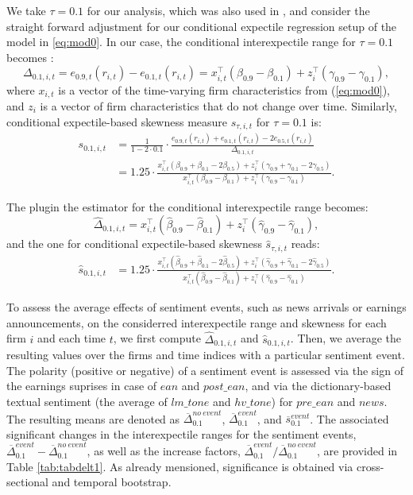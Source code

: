 \documentclass[11pt]{article}
\begin{document}
We take \(\tau=0.1\) for our analysis, which was also used in \cite{eberl2022sk}, and consider the straight forward adjustment for our conditional expectile regression setup of the model in \eqref{eq:mod0}. In our case, the conditional interexpectile range for $\tau=0.1$ becomes :
\[\Delta_{0.1,i,t} = e_{0.9,t}(r_{i,t}) -  e_{0.1,t}(r_{i,t}) = x_{i,t}^\top (\beta_{0.9} - \beta_{0.1}) + z_i^\top(\gamma_{0.9} - \gamma_{0.1}),\]
where $x_{i,t}$ is a vector of the time-varying firm characteristics from (\ref{eq:mod0}), and $z_i$ is a vector of firm characteristics that do not change over time. Similarly, conditional expectile-based skewness measure $\hat s_{\tau,i,t}$ for $\tau=0.1$ is:
\begin{align*}s_{0.1,i,t} &= \frac 1{1-2\cdot0.1}\cdot\frac{e_{0.9,t}(r_{i,t}) + e_{0.1,t}(r_{i,t}) - 2e_{0.5,t}(r_{i,t})}{\Delta_{0.1,i,t}}\\
&=1.25\cdot\frac{x_{i,t}^\top (\beta_{0.9} + \beta_{0.1} - 2\beta_{0.5}) + z_i^\top(\gamma_{0.9} + \gamma_{0.1} - 2\gamma_{0.5})}{x_{i,t}^\top (\beta_{0.9} - \beta_{0.1}) + z_i^\top(\gamma_{0.9} - \gamma_{0.1})}.
\end{align*}

The plugin the estimator for the conditional interexpectile range becomes:
\[\hat\Delta_{0.1,i,t} = x_{i,t}^\top (\hat\beta_{0.9} - \hat\beta_{0.1}) + z_i^\top(\hat\gamma_{0.9} - \hat\gamma_{0.1}),\]
and the one for conditional expectile-based skewness $\hat s_{\tau,i,t}$ reads:
\begin{align*}\hat s_{0.1,i,t} &= 1.25\cdot\frac{x_{i,t}^\top (\hat\beta_{0.9} + \hat\beta_{0.1} - 2\hat\beta_{0.5}) + z_i^\top(\hat\gamma_{0.9} + \hat\gamma_{0.1} - 2\hat\gamma_{0.5})}{x_{i,t}^\top (\hat\beta_{0.9} - \hat\beta_{0.1}) + z_i^\top(\hat\gamma_{0.9} - \hat\gamma_{0.1})}.
\end{align*}

To assess the average effects of sentiment events, such as news arrivals or earnings announcements, on the considerred interexpectile range and skewness for each firm $i$ and each time $t$,  we first compute \(\hat\Delta_{0.1,i,t}\) and $\hat s_{0.1,i,t}$. Then, we average the resulting values over the firms and time indices with a particular sentiment event. The polarity (positive or negative) of a sentiment event is assessed via the sign of the earnings suprises in case of $ean$ and $post\_ean$, and via the dictionary-based textual sentiment (the average of $lm\_tone$ and $hv\_tone$) for $pre\_ean$ and $news$. The resulting means are denoted as \(\overline\Delta_{0.1}^{no~event}\), \(\overline\Delta_{0.1}^{event}\), and $\overline s_{0.1}^{event}$. The associated significant changes in the interexpectile ranges for the sentiment events, \(\overline\Delta^{event}_{0.1}-\overline\Delta^{no~event}_{0.1}\), as well as the increase factors, \(\overline\Delta^{event}_{0.1}/\overline\Delta^{no~event}_{0.1}\), are provided in Table \ref{tab:tabdelt1}. As already mensioned, significance is obtained via cross-sectional and temporal bootstrap.
\end{document}
